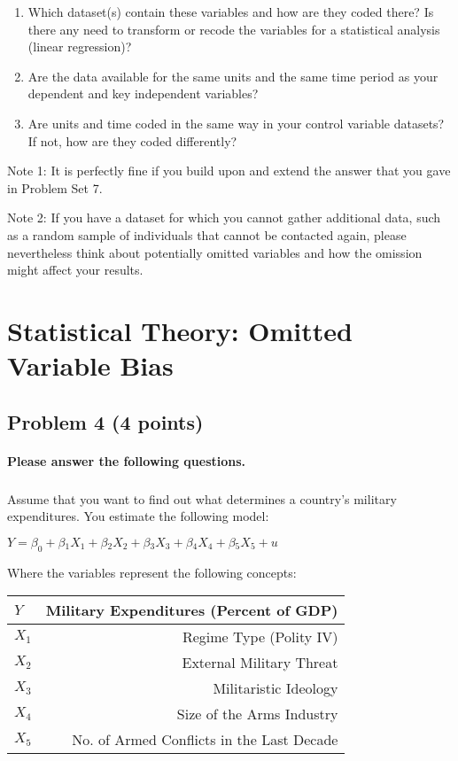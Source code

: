\documentclass[12pt]{article}
\begin{document}
\begin{enumerate}
	\item Which dataset(s) contain these variables and how are they coded there? Is there any need to transform or recode the variables for a statistical analysis (linear regression)?
	\item Are the data available for the same units and the same time period as your dependent and key independent variables?
	\item Are units and time coded in the same way in your control variable datasets? If not, how are they coded differently?
\end{enumerate}

Note 1: It is perfectly fine if you build upon and extend the answer that you gave in Problem Set 7.

Note 2: If you have a dataset for which you cannot gather additional data, such as a random sample of individuals that cannot be contacted again, please nevertheless think about potentially omitted variables and how the omission might affect your results.



\section*{Statistical Theory: Omitted Variable Bias}

\subsection*{Problem 4 (4 points)}

\paragraph{Please answer the following questions.}

\subparagraph*{}

Assume that you want to find out what determines a country's military expenditures. You estimate the following model:

$ Y = \beta_0 + \beta{_1}X_1 + \beta{_2}X_2 + \beta{_3}X_3 + \beta{_4}X_4 + \beta{_5}X_5 + u$

\bigskip

Where the variables represent the following concepts:

\begin{center}
	\begin{tabular}{ | l | r | }
		\hline
		$Y$ & Military Expenditures (Percent of GDP) \\ \hline
		$X_1$ & Regime Type (Polity IV) \\ \hline
		$X_2$ & External Military Threat \\ \hline
		$X_3$ & Militaristic Ideology \\ \hline
		$X_4$ & Size of the Arms Industry \\ \hline
		$X_5$ & No. of Armed Conflicts in the Last Decade\\
		\hline
	\end{tabular}
\end{center}
\end{document}
